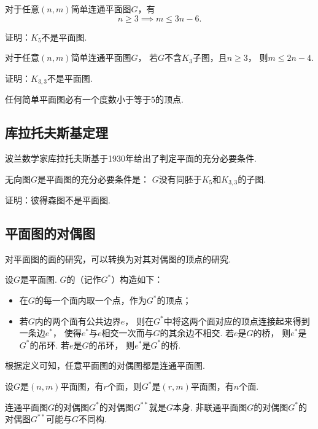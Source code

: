 \begin{corollary}
对于任意\((n,m)\)简单连通平面图\(G\)，有\[
	n\geq3 \implies m\leq3n-6.
\]
\end{corollary}

\begin{example}
证明：\(K_5\)不是平面图.
\end{example}

\begin{corollary}
对于任意\((n,m)\)简单连通平面图\(G\)，
若\(G\)不含\(K_3\)子图，且\(n\geq3\)，
则\(m\leq2n-4\).
\end{corollary}

\begin{example}
证明：\(K_{3,3}\)不是平面图.
\end{example}

\begin{theorem}
任何简单平面图必有一个度数小于等于\(5\)的顶点.
\end{theorem}

\subsection{库拉托夫斯基定理}
波兰数学家库拉托夫斯基于1930年给出了判定平面的充分必要条件.

\begin{theorem}
无向图\(G\)是平面图的充分必要条件是：
\(G\)没有同胚于\(K_5\)和\(K_{3,3}\)的子图.
\end{theorem}

\begin{example}
证明：彼得森图不是平面图.
\end{example}

\subsection{平面图的对偶图}
对平面图的面的研究，可以转换为对其对偶图的顶点的研究.
\begin{definition}
设\(G\)是平面图.
\(G\)的（记作\(G^*\)）构造如下：\begin{itemize}
	\item 在\(G\)的每一个面内取一个点，作为\(G^*\)的顶点；
	\item 若\(G\)内的两个面有公共边界\(e\)，
	则在\(G^*\)中将这两个面对应的顶点连接起来得到一条边\(e^*\)，
	使得\(e^*\)与\(e\)相交一次而与\(G\)的其余边不相交.
	若\(e\)是\(G\)的桥，
	则\(e^*\)是\(G^*\)的吊环.
	若\(e\)是\(G\)的吊环，
	则\(e^*\)是\(G^*\)的桥.
\end{itemize}
\end{definition}

根据定义可知，任意平面图的对偶图都是连通平面图.

设\(G\)是\((n,m)\)平面图，有\(r\)个面，则\(G^*\)是\((r,m)\)平面图，有\(n\)个面.

连通平面图\(G\)的对偶图\(G^*\)的对偶图\(G^{**}\)就是\(G\)本身.
非联通平面图\(G\)的对偶图\(G^*\)的对偶图\(G^{**}\)可能与\(G\)不同构.
